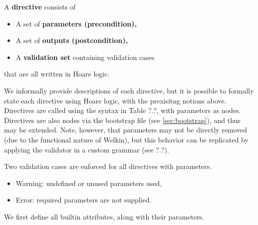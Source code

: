 \begin{definition}
A \textbf{directive} consists of
\begin{itemize}
  \item A set of \textbf{parameters (precondition),}
  \item A set of \textbf{outputs (postcondition),}
  \item A \textbf{validation set} containing validation cases
\end{itemize}
that are all written in Hoare logic.
\end{definition}
We informally provide descriptions of each directive, but it is possible to formally state each directive using Hoare logic, with the prexisitng notions above. Directives are called using the syntax in Table ?.?, with parameters as nodes. Directives are also nodes via the bootstrap file (see \ref{sec:bootstrap}), and thus may be extended. Note, however, that parameters may not be directly removed (due to the functional nature of Welkin), but this behavior can be replicated by applying the validator in a custom grammar (see ?.?).

Two validation cases are enforced for all directives with parameters.
\begin{itemize}
  \item Warning: undefined or unused parameters used,
  \item Error: required parameters are not supplied.
\end{itemize}

We first define all builtin attributes, along with their parameters.


